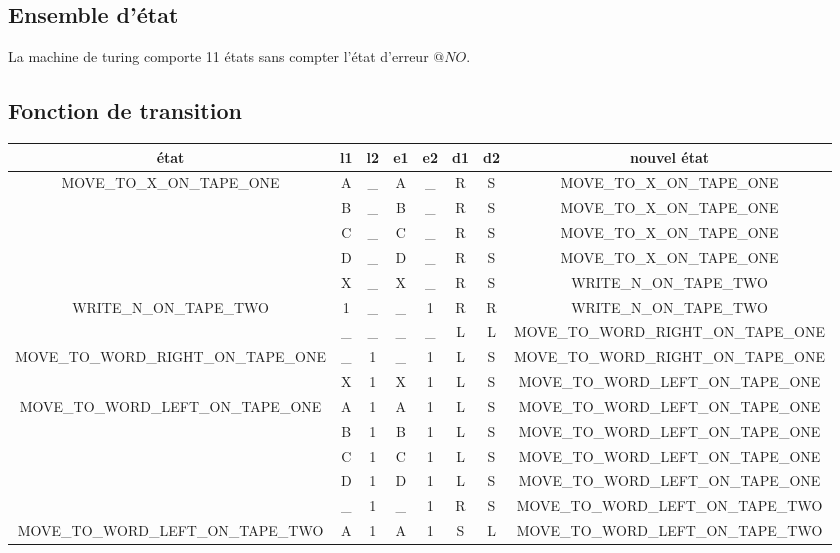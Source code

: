 \documentclass{report}
\begin{document}
\subsection{Ensemble d'état}
La machine de turing comporte 11 états sans compter l'état d'erreur $@NO$.

\subsection{Fonction de transition}


\begin{adjustwidth}{-1.5cm}{0cm}
\begin{tabular}{| c | c c | c c | c c | c |}
  \hline
  état & l1 & l2 & e1 & e2 & d1 & d2 & nouvel état \\
  \hline
  MOVE\_TO\_X\_ON\_TAPE\_ONE & A & \_ & A & \_ & R & S & MOVE\_TO\_X\_ON\_TAPE\_ONE \\
       & B & \_ & B & \_ & R & S & MOVE\_TO\_X\_ON\_TAPE\_ONE \\
       & C & \_ & C & \_ & R & S & MOVE\_TO\_X\_ON\_TAPE\_ONE \\
       & D & \_ & D & \_ & R & S & MOVE\_TO\_X\_ON\_TAPE\_ONE \\
       & X & \_ & X & \_ & R & S & WRITE\_N\_ON\_TAPE\_TWO \\
  \hline
  WRITE\_N\_ON\_TAPE\_TWO & 1 & \_ & \_ & 1 & R & R & WRITE\_N\_ON\_TAPE\_TWO \\
       & \_ & \_ & \_ & \_ & L & L & MOVE\_TO\_WORD\_RIGHT\_ON\_TAPE\_ONE \\
  \hline
  MOVE\_TO\_WORD\_RIGHT\_ON\_TAPE\_ONE & \_ & 1 & \_ & 1 & L & S & MOVE\_TO\_WORD\_RIGHT\_ON\_TAPE\_ONE \\
       & X & 1 & X & 1 & L & S & MOVE\_TO\_WORD\_LEFT\_ON\_TAPE\_ONE \\
  \hline
  MOVE\_TO\_WORD\_LEFT\_ON\_TAPE\_ONE & A & 1 & A & 1 & L & S & MOVE\_TO\_WORD\_LEFT\_ON\_TAPE\_ONE \\
       & B & 1 & B & 1 & L & S & MOVE\_TO\_WORD\_LEFT\_ON\_TAPE\_ONE \\
       & C & 1 & C & 1 & L & S & MOVE\_TO\_WORD\_LEFT\_ON\_TAPE\_ONE \\
       & D & 1 & D & 1 & L & S & MOVE\_TO\_WORD\_LEFT\_ON\_TAPE\_ONE \\
       & \_ & 1 & \_ & 1 & R & S & MOVE\_TO\_WORD\_LEFT\_ON\_TAPE\_TWO \\
  \hline
  MOVE\_TO\_WORD\_LEFT\_ON\_TAPE\_TWO & A & 1 & A & 1 & S & L & MOVE\_TO\_WORD\_LEFT\_ON\_TAPE\_TWO \\

\end{tabular}
\end{adjustwidth}
\end{document}
